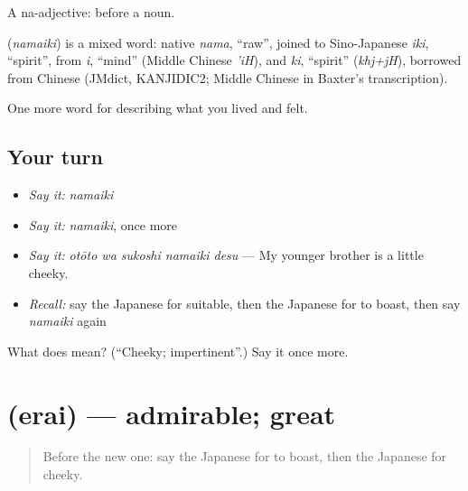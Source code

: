 A na-adjective:  before a noun.

\begin{cousinweb}
\textbf{} (\emph{namaiki}) is a mixed word: native \emph{nama}, \textquotedblleft{}raw\textquotedblright{}, joined to Sino-Japanese \emph{iki}, \textquotedblleft{}spirit\textquotedblright{}, from \emph{i}, \textquotedblleft{}mind\textquotedblright{} (Middle Chinese \emph{'iH}), and \emph{ki}, \textquotedblleft{}spirit\textquotedblright{} (\emph{khj+jH}), borrowed from Chinese (JMdict, KANJIDIC2; Middle Chinese in Baxter's transcription).
\end{cousinweb}

\begin{grammarlens}[title={What you've built}]
One more word for describing what you lived and felt.
\end{grammarlens}

\subsection*{Your turn}
\begin{itemize}
\raggedright
  \item \emph{Say it:} \emph{namaiki}
  \item \emph{Say it:} \emph{namaiki}, once more
  \item \emph{Say it:} \emph{otōto wa sukoshi namaiki desu} — My younger brother is a little cheeky.
  \item \emph{Recall:} say the Japanese for suitable, then the Japanese for to boast, then say \emph{namaiki} again
\end{itemize}

\begin{tcolorbox}[breakable,colback=teal!4,colframe=teal!35!black,title={Before you move on}]
What does  mean? (\textquotedblleft{}Cheeky; impertinent\textquotedblright{}.) Say it once more.
\end{tcolorbox}
\section[\texorpdfstring{\ja{えらい} (erai)}{えらい (erai)}]{ (erai) — admirable; great}

\label{lesson:JA-C441-erai}



\begin{quote}
Before the new one: say the Japanese for to boast, then the Japanese for cheeky.
\end{quote}


